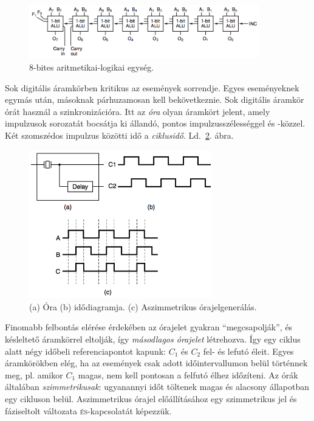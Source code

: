 \documentclass[a4paper]{article}
\begin{document}
\begin{figure}[htbp]
	\centering
		\includegraphics[width=10cm]{8bitalu}
	\caption{8-bites aritmetikai-logikai egység.\label{fig:8bitalu}}
\end{figure}

Sok digitális áramkörben kritikus az események sorrendje. Egyes eseményeknek egymás után, másoknak párhuzamosan kell bekövetkeznie. Sok digitális áramkör órát használ a szinkronizációra. Itt az \emph{óra} olyan áramkört jelent, amely impulzusok sorozatát bocsátja ki állandó, pontos impulzusszélességgel és -közzel. Két szomszédos impulzus közötti idő a \emph{ciklusidő}. Ld.~\ref{fig:ora}. ábra.

\begin{figure}[htbp]
	\centering
		\includegraphics[width=8cm]{ora}
	\caption{(a) Óra (b) idődiagramja. (c) Aszimmetrikus órajelgenerálás.\label{fig:ora}}
\end{figure}

Finomabb felbontás elérése érdekében az órajelet gyakran ``megcsapolják'', és késleltető áramkörrel eltolják, így \emph{másodlagos órajelet} létrehozva. Így egy ciklus alatt négy időbeli referenciapontot kapunk: $C_1$ és $C_2$ fel- és lefutó éleit. Egyes áramkörökben elég, ha az események csak adott időintervallumon belül történnek meg, pl. amikor $C_1$ magas, nem kell pontosan a felfutó élhez időzíteni. Az órák általában \emph{szimmetrikusak}: ugyanannyi időt töltenek magas és alacsony állapotban egy cikluson belül. Aszimmetrikus órajel előállításához egy szimmetrikus jel és fáziseltolt változata \textsc{és}-kapcsolatát képezzük.
\end{document}
